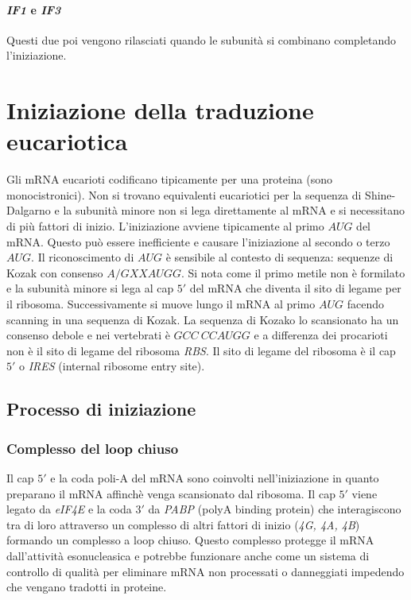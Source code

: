\paragraph{\emph{IF1} e \emph{IF3}} Questi due poi vengono rilasciati quando le subunit\`a si combinano completando l'iniziazione.
\section{Iniziazione della traduzione eucariotica}
Gli mRNA eucarioti codificano tipicamente per una proteina (sono monocistronici). Non si trovano equivalenti eucariotici per la sequenza di Shine-Dalgarno e la subunit\`a minore non si lega direttamente
al mRNA e si necessitano di pi\`u fattori di inizio. L'iniziazione avviene tipicamente al primo $AUG$ del mRNA. Questo pu\`o essere inefficiente e causare l'iniziazione al secondo o terzo $AUG$. Il
riconoscimento di $AUG$ \`e sensibile al contesto di sequenza: sequenze di Kozak con consenso $A/GXXAUGG$. Si nota come il primo metile non \`e formilato e la subunit\`a minore si lega al cap $5'$ del
mRNA che diventa il sito di legame per il ribosoma. Successivamente si muove lungo il mRNA al primo $AUG$ facendo scanning in una sequenza di Kozak. La sequenza di Kozako lo scansionato ha un consenso
debole e nei vertebrati \`e $GCC\ CCAUGG$ e a differenza dei procarioti non \`e il sito di legame del ribosoma \emph{RBS}. Il sito di legame del ribosoma \`e il cap $5'$ o \emph{IRES} (internal ribosome
entry site). 
\subsection{Processo di iniziazione}
\subsubsection{Complesso del loop chiuso}
Il cap $5'$ e la coda poli-A del mRNA sono coinvolti nell'iniziazione in quanto preparano il mRNA affinch\`e venga scansionato dal ribosoma. Il cap $5'$ viene legato da \emph{eIF4E} e la coda
$3'$ da \emph{PABP} (polyA binding protein) che interagiscono tra di loro  attraverso un complesso di altri fattori di inizio (\emph{4G, 4A, 4B}) formando un complesso a loop chiuso. Questo complesso 
protegge il mRNA dall'attivit\`a esonucleasica e potrebbe funzionare anche come un sistema di controllo di qualit\`a per eliminare mRNA non processati o danneggiati impedendo che vengano tradotti in 
proteine. 

